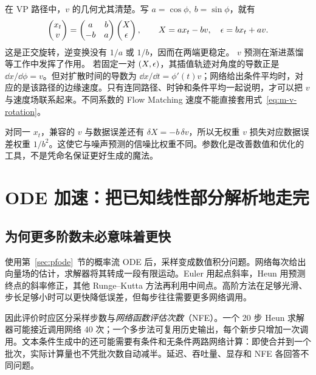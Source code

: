在 VP 路径中，$v$ 的几何尤其清楚。写
$a=\cos\phi,\ b=\sin\phi$，就有
\begin{equation}
\begin{pmatrix}x_t\\v\end{pmatrix}
=
\begin{pmatrix}a&b\\-b&a\end{pmatrix}
\begin{pmatrix}X\\\epsilon\end{pmatrix},
\qquad
X=ax_t-bv,\quad\epsilon=bx_t+av.
\label{eq:m-v-rotation}
\end{equation}
这是正交旋转，逆变换没有 $1/a$ 或 $1/b$，因而在两端更稳定。
$v$ 预测在渐进蒸馏等工作中发挥了作用。\cite{r_vpred}
若固定一对 $(X,\epsilon)$，其插值轨迹对角度的导数正是
$\dd x/\dd\phi=v$。但对扩散时间的导数为
$\dd x/\dd t=\phi'(t)v$；网络给出条件平均时，对应的是该路径的边缘速度。只有连同路径、时钟和条件平均一起说明，才可以把 $v$ 与速度场联系起来。不同系数的 Flow Matching 速度不能直接套用式~\eqref{eq:m-v-rotation}。

对同一 $x_t$，兼容的 $v$ 与数据误差还有
$\delta X=-b\,\delta v$，所以无权重 $v$ 损失对应数据误差权重
$1/b^2$。这使它与噪声预测的信噪比权重不同。参数化是改善数值和优化的工具，不是凭命名保证更好生成的魔法。

\section{ODE 加速：把已知线性部分解析地走完}
\label{sec:m-solvers}

\subsection{为何更多阶数未必意味着更快}

使用第~\ref{sec:pfode}~节的概率流 ODE 后，采样变成数值积分问题。网络每次给出向量场的估计，求解器将其转成一段有限运动。Euler 用起点斜率，Heun 用预测终点的斜率修正，其他 Runge--Kutta 方法再利用中间点。高阶方法在足够光滑、步长足够小时可以更快降低误差，但每步往往需要更多网络调用。

因此评价时应区分采样步数与\emph{网络函数评估次数}（NFE）。一个 20 步 Heun 求解器可能接近调用网络 40 次；一个多步法可复用历史输出，每个新步只增加一次调用。文本条件生成中的还可能需要有条件和无条件两路网络计算：即使合并到一个批次，实际计算量也不凭批次数自动减半。延迟、吞吐量、显存和 NFE 各回答不同问题。

